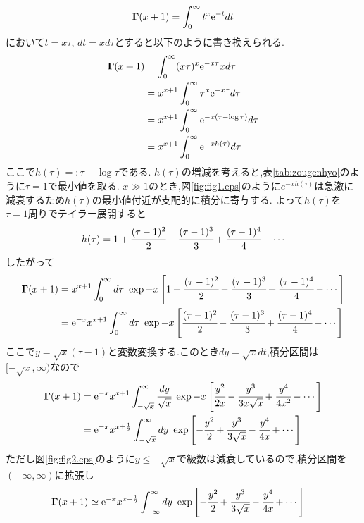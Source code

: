 \subsection{}
\begin{align}
  {\bf\Gamma}(x+1)=\int^{\infty}_0t^x{\rm e}^{-t}dt
\end{align}
において$t=x\tau$, $dt=xd\tau$とすると以下のように書き換えられる.
\begin{align}
  {\bf\Gamma}(x+1)&=\int^{\infty}_0(x\tau)^x{\rm e}^{-x\tau}xd\tau\\
  &=x^{x+1}\int^{\infty}_0\tau^x{\rm e}^{-x\tau}d\tau\\
  &=x^{x+1}\int^{\infty}_0{\rm e}^{-x(\tau-\log\tau)}d\tau\\
  &=x^{x+1}\int^{\infty}_0{\rm e}^{-xh(\tau)}d\tau
\end{align}
ここで$h(\tau)=:\tau-\log\tau$である. $h(\tau)$の増減を考えると,表\ref{tab:zougenhyo}のように$\tau=1$で最小値を取る.
$x\gg1$のとき,図\ref{fig:fig1.eps}のように$e^{-xh(\tau)}$は急激に減衰するため$h(\tau)$の最小値付近が支配的に積分に寄与する.
よって$h(\tau)$を$\tau=1$周りでテイラー展開すると
\begin{align}
  h(\tau)=1+\cfrac{(\tau-1)^2}{2}-\cfrac{(\tau-1)^3}{3}+\cfrac{(\tau-1)^4}{4}-\cdots
\end{align}
したがって
\begin{align}
  {\bf\Gamma}(x+1)&=x^{x+1}\int^{\infty}_0d\tau\ \exp-x\left[1+\cfrac{(\tau-1)^2}{2}-\cfrac{(\tau-1)^3}{3}+\cfrac{(\tau-1)^4}{4}-\cdots\right]\\
  &={\rm e}^{-x}x^{x+1}\int^{\infty}_0d\tau\ \exp-x\left[\cfrac{(\tau-1)^2}{2}-\cfrac{(\tau-1)^3}{3}+\cfrac{(\tau-1)^4}{4}-\cdots\right]
\end{align}
ここで$y=\sqrt{x}(\tau-1)$と変数変換する.このとき$dy=\sqrt{x}dt$,積分区間は$[-\sqrt{x},\infty)$なので
\begin{align}
  {\bf\Gamma}(x+1)&={\rm e}^{-x}x^{x+1}\int^{\infty}_{-\sqrt{x}}\cfrac{dy}{\sqrt{x}}\ \exp-x\left[\cfrac{y^2}{2x}-\cfrac{y^3}{3x\sqrt{x}}+\cfrac{y^4}{4x^2}-\cdots\right]\\
  &={\rm e}^{-x}x^{x+\frac{1}{2}}\int^{\infty}_{-\sqrt{x}}dy\ \exp\left[-\cfrac{y^2}{2}+\cfrac{y^3}{3\sqrt{x}}-\cfrac{y^4}{4x}+\cdots\right]
\end{align}
ただし図\ref{fig:fig2.eps}のように$y\leq-\sqrt{x}$で級数は減衰しているので,積分区間を$(-\infty,\infty)$に拡張し
\begin{align}
  {\bf\Gamma}(x+1)&\simeq{\rm e}^{-x}x^{x+\frac{1}{2}}\int^{\infty}_{-\infty}dy\ \exp\left[-\cfrac{y^2}{2}+\cfrac{y^3}{3\sqrt{x}}-\cfrac{y^4}{4x}+\cdots\right]
\end{align}
